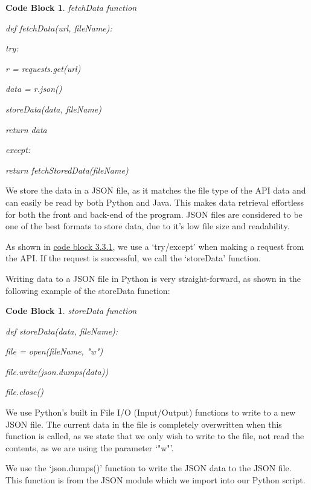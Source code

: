 \documentclass[12pt, a4paper, oneside]{book}
\newtheorem{codeblock}[theorem]{Code Block}
\numberwithin{equation}{section}
\begin{document}
\begin{codeblock} \label{fetchData function}
  fetchData function

  def fetchData(url, fileName):

  try:

  \hspace{\parindent} r = requests.get(url)

  \hspace{\parindent} data = r.json()

  \hspace{\parindent} storeData(data, fileName)

  \hspace{\parindent} return data

  except:

  \hspace{\parindent} return fetchStoredData(fileName)
\end{codeblock}

We store the data in a JSON file, as it matches the file type of the API data and can easily
be read by both Python and Java. This makes data retrieval effortless for both the front and
back-end of the program. JSON files are considered to be one of the best formats to store data,
due to it's low file size and readability.

As shown in \hyperref[fetchData function]{code block 3.3.1}, we use a `try/except' when making a request from the API. If the request is successful, we call the `storeData' function.

Writing data to a JSON file in Python is very straight-forward, as shown in the following
example of the storeData function:

\begin{codeblock} \label{storeData function}
  storeData function
  
  def storeData(data, fileName):

  file = open(fileName, "w")

  file.write(json.dumps(data))

  file.close()
\end{codeblock}

We use Python's built in File I/O (Input/Output) functions to write to a new JSON file.
The current data in the file is completely overwritten when this function is called, as we state
that we only wish to write to the file, not read the contents, as we are using the parameter
`"w"'.

We use the `json.dumps()' function to write the JSON data to the JSON file. This function
is from the JSON module which we import into our Python script.
\end{document}
